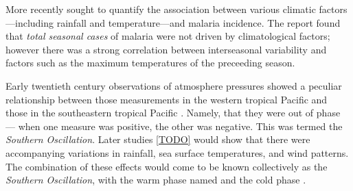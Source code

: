 More recently \cite{craig2004} sought to quantify the association between
various climatic factors---including rainfall and temperature---and malaria
incidence. The report found that \emph{total seasonal cases} of malaria were not
driven by climatological factors; however there was a strong correlation between
interseasonal variability and factors such as the maximum temperatures of the
preceeding season.




\vspace{1cm}

Early twentieth century observations of atmosphere pressures showed a peculiar
relationship between those measurements in the western tropical Pacific and
those in the southeastern tropical Pacific \citep{holton1989}. Namely, that they
were out of phase --- when one measure was positive, the other was negative.
This was termed the \emph{Southern Oscillation}. Later studies \ref{TODO} would
show that there were accompanying variations in rainfall, sea surface
temperatures, and wind patterns. The combination of these effects would come to
be known collectively as the \elnino{} \emph{Southern Oscillation}, with the
warm phase named \elnino{} and the cold phase \nina{}.


